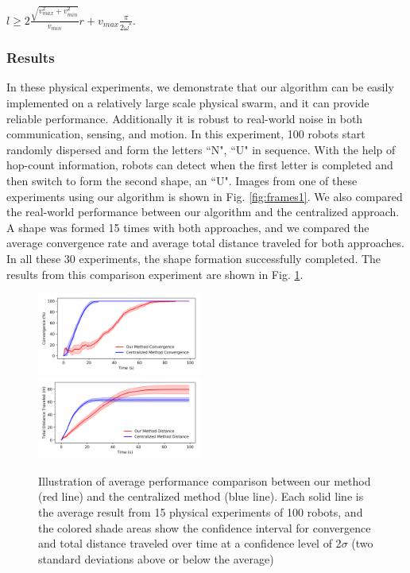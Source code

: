 \documentclass[journal]{IEEEtran}
\begin{document}
\begin{center}{ $l\geq 2\frac{\sqrt{v_{max}^2 + v_{min}^2}}{v_{min}}r + v_{max}\frac{\pi}{2\omega^*}$.}\end{center} 




\subsubsection{Results}

In these physical experiments, we demonstrate that our algorithm can be easily implemented on a relatively large scale physical swarm, and it can provide reliable performance.  Additionally it is robust to real-world noise in both communication, sensing, and motion. In this experiment, 100 robots start randomly dispersed and form the letters ``N", ``U" in sequence.  With the help of hop-count information, robots can detect when the first letter is completed and then switch to form the second shape, an ``U".  Images from one of these experiments using our algorithm is shown in Fig. \ref{fig:frames1}.
We also compared the real-world performance between our algorithm and the centralized approach. A shape was formed 15 times with both approaches, and we compared the average convergence rate and average total distance traveled for both approaches. In all these 30 experiments,  the shape formation successfully completed. The results from this comparison experiment are shown in Fig. \ref{fig:experi}.


\begin{figure}[h!]
\centering
\includegraphics[trim=10pt 10pt 10pt 5pt, clip,width=0.48\textwidth]{IEEEtran/comparison/experi/comparison_experi_con.png}\\
\includegraphics[trim=10pt 10pt 10pt 5pt, clip,width=0.48\textwidth]{IEEEtran/comparison/experi/comparison_experi_dis.png}
\caption{Illustration of average performance comparison between our method (red line) and the centralized method (blue line). Each solid line is the average result from 15 physical experiments of 100 robots, and the colored shade areas show the confidence interval for convergence and total distance traveled over time at a confidence level of 2$\sigma$ (two standard deviations above or below the average)}
\label{fig:experi}
\end{figure}
\end{document}
